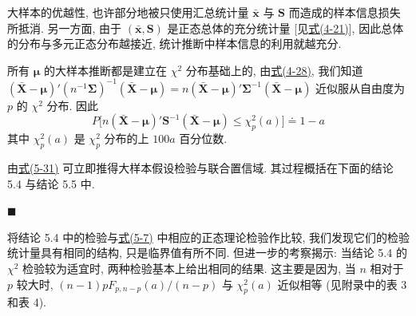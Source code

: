 大样本的优越性, 也许部分地被只使用汇总统计量 $\bar{\mathbf{x}}$ 与 $\mathbf{S}$ 而造成的样本信息损失所抵消. 另一方面, 由于 $(\bar{\mathbf{x}},\mathbf{S})$ 是正态总体的充分统计量 [见\hyperref[eq:4-21]{式(4-21)}], 因此总体的分布与多元正态分布越接近, 统计推断中样本信息的利用就越充分.

所有 $\boldsymbol{\mu}$ 的大样本推断都是建立在 $\chi^{2}$ 分布基础上的, 由\hyperref[eq:4-28]{式(4-28)}, 我们知道 $(\bar{\mathbf{X}}-\boldsymbol{\mu})'(n^{-1}\boldsymbol{\Sigma})^{-1}(\bar{\mathbf{X}}-\boldsymbol{\mu})=n(\bar{\mathbf{X}}-\boldsymbol{\mu})'\boldsymbol{\Sigma}^{-1}(\bar{\mathbf{X}}-\boldsymbol{\mu})$ 近似服从自由度为 $p$ 的 $\chi^{2}$ 分布. 因此
\label{eq:5-31}
\begin{equation}
P\bigl[n(\bar{\mathbf{X}}-\boldsymbol{\mu})'\mathbf{S}^{-1}(\bar{\mathbf{X}}-\boldsymbol{\mu})\le\chi_{p}^{2}(a)\bigr]\doteq 1-a
\tag{5-31}
\end{equation}
其中 $\chi_{p}^{2}(a)$ 是 $\chi_{p}^{2}$ 分布的上 $100a$ 百分位数.

由\hyperref[eq:5-31]{式(5-31)} 可立即推得大样本假设检验与联合置信域. 其过程概括在下面的结论 5.4 与结论 5.5 中.

\hfill$\blacksquare$

将结论 5.4 中的检验与\hyperref[eq:5-7]{式(5-7)} 中相应的正态理论检验作比较, 我们发现它们的检验统计量具有相同的结构, 只是临界值有所不同. 但进一步的考察揭示: 当结论 5.4 的 $\chi^{2}$ 检验较为适宜时, 两种检验基本上给出相同的结果. 这主要是因为, 当 $n$ 相对于 $p$ 较大时, $(n-1)pF_{p,n-p}(a)/(n-p)$ 与 $\chi_{p}^{2}(a)$ 近似相等 (见附录中的表 3 和表 4).


